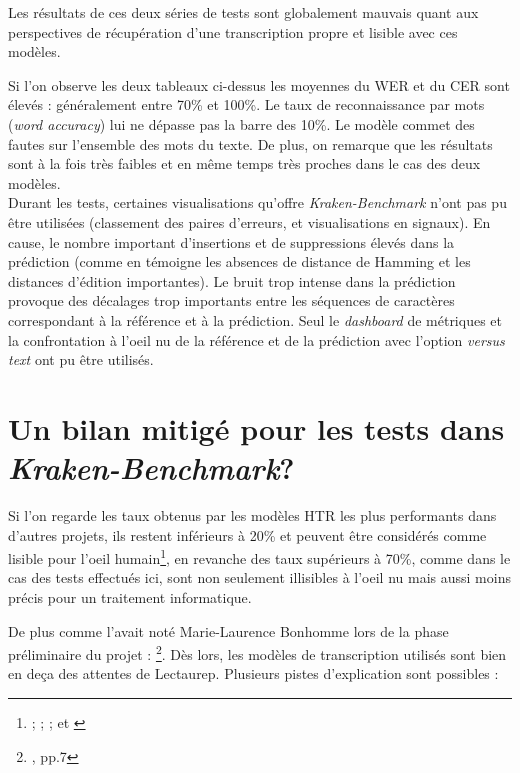 Les résultats de ces deux séries de tests sont globalement mauvais quant aux perspectives de récupération d'une transcription propre et lisible avec ces modèles. 

Si l'on observe les deux tableaux ci-dessus les moyennes du WER et du CER sont élevés : généralement entre 70\% et 100\%. Le taux de reconnaissance par mots (\textit{word accuracy}) lui ne dépasse pas la barre des 10\%. Le modèle commet des fautes sur l'ensemble des mots du texte. De plus, on remarque que les résultats sont à la fois très faibles et en même temps très proches dans le cas des deux modèles.\\

Durant les tests, certaines visualisations qu'offre \textit{Kraken-Benchmark} n'ont pas pu être utilisées (classement des paires d'erreurs, et visualisations en signaux). En cause, le nombre important d'insertions et de suppressions élevés dans la prédiction (comme en témoigne les absences de distance de Hamming et les distances d'édition importantes). Le bruit trop intense dans la prédiction provoque des décalages trop importants entre les séquences de caractères correspondant à la référence et à la prédiction. Seul le \textit{dashboard} de métriques et la confrontation à l'oeil nu de la référence et de la prédiction avec l'option \textit{versus text} ont pu être utilisés. 
\newpage
\section{Un bilan mitigé pour les tests dans\\ \textit{Kraken-Benchmark}?}

Si l'on regarde les taux obtenus par les modèles HTR les plus performants dans d'autres projets, ils restent inférieurs à 20\% et peuvent être considérés comme lisible pour l'oeil humain\footnote{\cite{barrere_results_2018};  \cite{pratikakis_icfhr_2018}; \cite{olver_machine_2017}; \cite{ares_oliveira_comparing_2018} et \cite{lavrenko_holistic_2004}}, en revanche des taux supérieurs à 70\%, comme dans le cas des tests effectués ici, sont non seulement illisibles à l'oeil nu mais aussi moins précis pour un traitement informatique. 

De plus comme l'avait noté Marie-Laurence Bonhomme lors de la phase préliminaire du projet : \footnote{\cite{bonhomme_defis_2018}, pp.7}. Dès lors, les modèles de transcription utilisés sont bien en deça des attentes de Lectaurep. Plusieurs pistes d'explication sont possibles :

